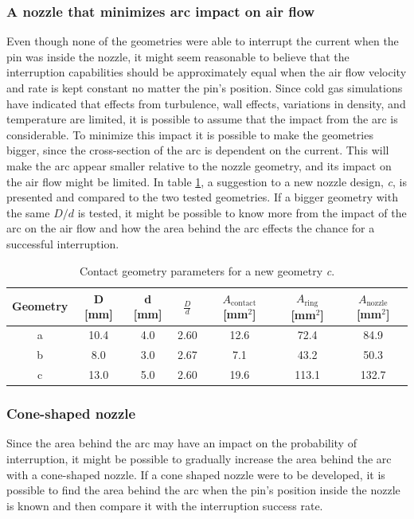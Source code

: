 \documentclass[10pt,a4paper,twoside]{article}
\begin{document}
\subsubsection{A nozzle that minimizes arc impact on air flow}
Even though none of the geometries were able to interrupt the current when the pin was inside the nozzle, it might seem reasonable to believe that the interruption capabilities should be approximately equal when the air flow velocity and rate is kept constant no matter the pin's position. Since cold gas simulations have indicated that effects from turbulence, wall effects, variations in density, and temperature are limited, it is possible to assume that the impact from the arc is considerable. To minimize this impact it is possible to make the geometries bigger, since the cross-section of the arc is dependent on the current. This will make the arc appear smaller relative to the nozzle geometry, and its impact on the air flow might be limited. In table \ref{tab:contGeoParaNew}, a suggestion to a new nozzle design, \textit{c}, is presented and compared to the two tested geometries. If a bigger geometry with the same ${D}/{d}$ is tested, it might be possible to know more from the impact of the arc on the air flow and how the area behind the arc effects the chance for a successful interruption.

\begin{table}[H]
\center
\caption{Contact geometry parameters for a new geometry \textit{c}.}
 \begin{tabular}{|c|c|c|c|c|c|c|}
\hline 
Geometry & D [mm] & d [mm] & $\frac{D}{d}$ & $A_\mathrm{{contact}}$ [mm$^2$] & $A_\mathrm{{ring}}$ [mm$^2$] & $A_\mathrm{{nozzle}}$ [mm$^2$] \\ 
\hline 
a & 10.4 & 4.0 & 2.60 & 12.6 & 72.4 & 84.9 \\ 
\hline 
b & 8.0 & 3.0 & 2.67 & 7.1 & 43.2 & 50.3 \\ 
\hline 
c & 13.0 & 5.0 & 2.60 & 19.6 & 113.1 & 132.7 \\ 
\hline
\end{tabular} 
\label{tab:contGeoParaNew}
\end{table}

\subsubsection{Cone-shaped nozzle}
Since the area behind the arc may have an impact on the probability of interruption, it might be possible to gradually increase the area behind the arc with a cone-shaped nozzle. If a cone shaped nozzle were to be developed, it is possible to find the area behind the arc when the pin's position inside the nozzle is known and then compare it with the interruption success rate.
\end{document}

